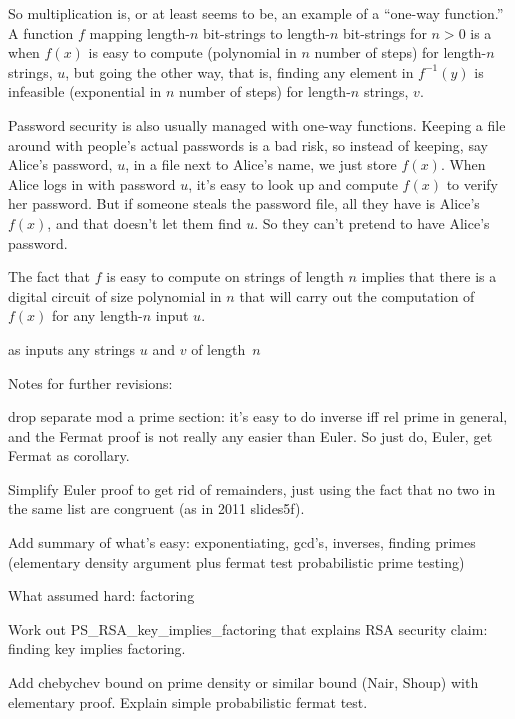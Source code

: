 So multiplication is, or
at least seems to be, an example of a ``one-way function.''  A
function $f$ mapping length-$n$ bit-strings to length-$n$ bit-strings
for $n > 0$ is a  when $f(x)$ is easy to
compute (polynomial in $n$ number of steps) for length-$n$ strings,
$u$, but going the other way, that is, finding any element in
$f^{-1}(y)$ is infeasible (exponential in $n$ number of steps) for
length-$n$ strings, $v$.

Password security is also usually managed with one-way functions.
Keeping a file around with people's actual passwords is a bad risk, so
instead of keeping, say Alice's password, $u$, in a file next to
Alice's name, we just store $f(x)$.  When Alice logs in with password
$u$, it's easy to look up and compute $f(x)$ to verify her password.
But if someone steals the password file, all they have is Alice's
$f(x)$, and that doesn't let them find $u$.  So they can't pretend to
have Alice's password.

The fact that $f$ is easy to compute on strings of length $n$ implies
that there is a digital circuit of size polynomial in $n$ that will
carry out the computation of $f(x)$ for any length-$n$ input $u$.

as inputs any strings $u$ and $v$ of length~$n$
\fi


\begin{problems}

\classproblems
{}
\end{problems}



\begin{editingnotes}
Notes for further revisions:

drop separate mod a prime section: it's easy to do inverse iff rel
prime in general, and the Fermat proof is not really any easier than
Euler. So just do, Euler, get Fermat as corollary.

Simplify Euler proof to get rid of remainders, just using the fact
that no two in the same list are congruent (as in 2011 slides5f).

Add summary of what's easy: exponentiating, gcd's, inverses, finding
primes (elementary density argument plus fermat test probabilistic
prime testing)

What assumed hard: factoring

Work out PS_RSA_key_implies_factoring that explains RSA security
claim: finding key implies factoring.

Add chebychev bound on prime density or similar bound (Nair, Shoup) with
elementary proof.  Explain simple probabilistic fermat test.
\end{editingnotes}

\endinput
